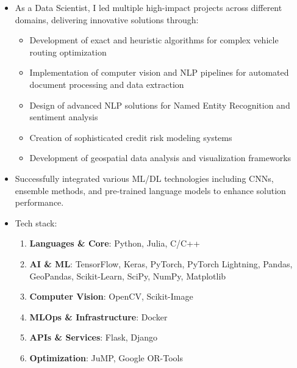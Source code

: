 {
\begin{itemize}
\item As a Data Scientist, I led multiple high-impact projects across different domains, delivering innovative solutions through:
\begin{itemize}
    \item Development of exact and heuristic algorithms for complex vehicle routing optimization
    \item Implementation of computer vision and NLP pipelines for automated document processing and data extraction
    \item Design of advanced NLP solutions for Named Entity Recognition and sentiment analysis
    \item Creation of sophisticated credit risk modeling systems
    \item Development of geospatial data analysis and visualization frameworks
\end{itemize}
\item Successfully integrated various ML/DL technologies including CNNs, ensemble methods, and pre-trained language models to enhance solution performance.
\item Tech stack:
\begin{enumerate}
    \item \textbf{Languages \& Core}: {\color{accent2}Python, Julia, C/C++}
    \item \textbf{AI \& ML}: {\color{accent2}TensorFlow, Keras, PyTorch, PyTorch Lightning, Pandas, GeoPandas, Scikit-Learn, SciPy, NumPy, Matplotlib}
    \item \textbf{Computer Vision}: {\color{accent2}OpenCV, Scikit-Image}
    \item \textbf{MLOps \& Infrastructure}: {\color{accent2}Docker}
    \item \textbf{APIs \& Services}: {\color{accent2}Flask, Django}
    \item \textbf{Optimization}: {\color{accent2}JuMP, Google OR-Tools}
\end{enumerate}
\end{itemize}

\divider}